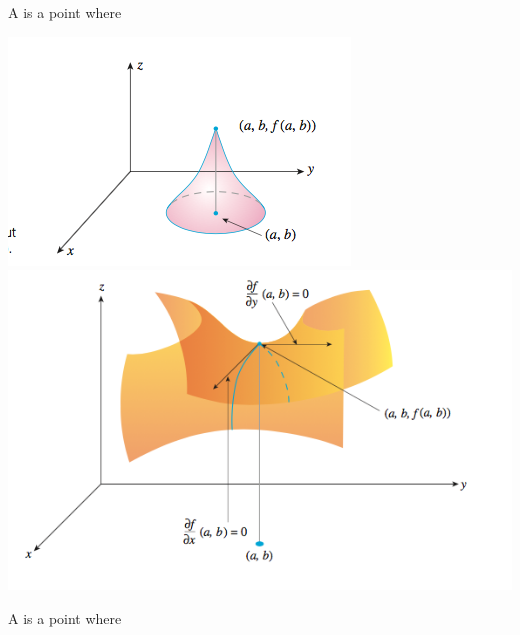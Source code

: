 \documentclass[12pt, a4paper]{article}
\begin{document}
\begin{defi}
  A  is a point where 
\end{defi}
\includegraphics[scale=0.5]{images/critical-pt-deriv-dne} \includegraphics[scale=0.35]{images/saddle-point}
\begin{defi}
  A  is a point where 
\end{defi}
\end{document}
